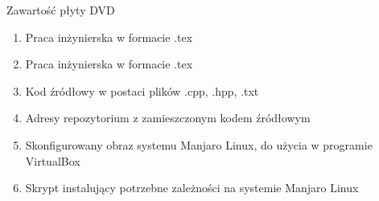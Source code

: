 \cleardoublepage
{}
\thispagestyle{plain}

{}

Zawartość płyty DVD
\begin{enumerate}
\item Praca inżynierska w formacie .tex
\item Praca inżynierska w formacie .tex
\item Kod źródłowy w postaci plików .cpp, .hpp, .txt
\item Adresy repozytorium z zamieszczonym kodem źródłowym
\item Skonfigurowany obraz systemu Manjaro Linux, do użycia w programie VirtualBox
\item Skrypt instalujący potrzebne zależności na systemie Manjaro Linux
\end{enumerate}

\restoregeometry
\makeatother
